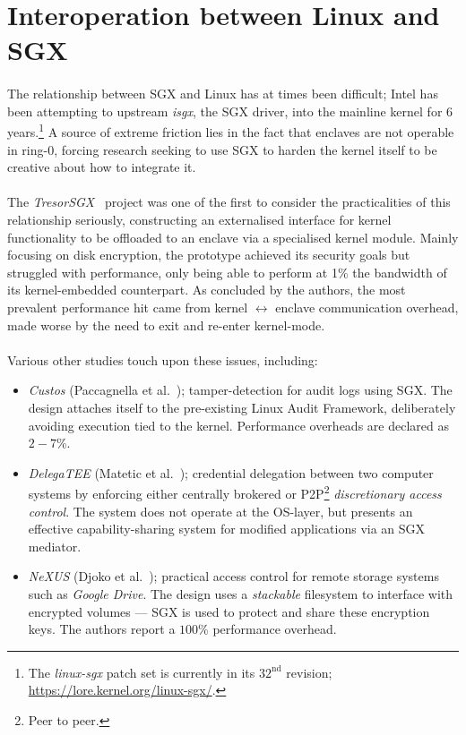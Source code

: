 \section{Interoperation between Linux and SGX} 
\paragraph{} The relationship between SGX and Linux has at times been difficult; Intel has been attempting to upstream \textit{isgx}, the SGX driver, into the mainline kernel for 6 years.\footnote{The \textit{linux-sgx} patch set is currently in its $32^{\text{nd}}$ revision; \url{https://lore.kernel.org/linux-sgx/}.} A source of extreme friction lies in the fact that enclaves are not operable in ring-0, forcing research seeking to use SGX to harden the kernel itself to be creative about how to integrate it.

\paragraph{} The \textit{TresorSGX}~\cite{10.1145/3007788.3007796} project was one of the first to consider the practicalities of this relationship seriously, constructing an externalised interface for kernel functionality to be offloaded to an enclave via a specialised kernel module. Mainly focusing on disk encryption, the prototype achieved its security goals but struggled with performance, only being able to perform at 1\% the bandwidth of its kernel-embedded counterpart. As concluded by the authors, the most prevalent performance hit came from kernel $\leftrightarrow$ enclave communication overhead, made worse by the need to exit and re-enter kernel-mode.


\paragraph{} Various other studies touch upon these issues, including:

\begin{itemize}
    \item \textit{Custos} (Paccagnella et al.~\cite{Karande2017SGXLogSS}); tamper-detection for audit logs using SGX. The design attaches itself to the pre-existing Linux Audit Framework, deliberately avoiding execution tied to the kernel. Performance overheads are declared as $2-7$\%. 
    \item \textit{DelegaTEE} (Matetic et al.~\cite{10.5555/3277203.3277308}); credential delegation between two computer systems by enforcing either centrally brokered or P2P\footnote{Peer to peer.} \textit{discretionary access control}. The system does not operate at the OS-layer, but presents an effective capability-sharing system for modified applications via an SGX mediator.
    \item \textit{NeXUS} (Djoko et al.~\cite{nexus8809505}); practical access control for remote storage systems such as \textit{Google Drive}. The design uses a \textit{stackable} filesystem to interface with encrypted volumes --- SGX is used to protect and share these encryption keys. The authors report a $100$\% performance overhead.
\end{itemize}


